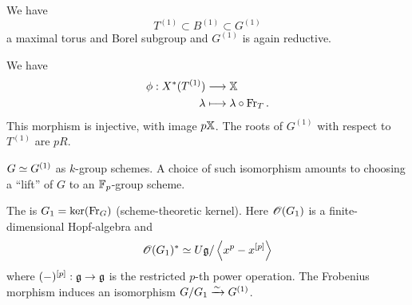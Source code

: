 We have
\[
T^{(1)} \subset B^{(1)}\subset G^{(1)}
\] 
a maximal torus and Borel subgroup and $G^{(1)}$ is again reductive. 

We have
\begin{align*}
	\phi: X^{*}(T^{(1)}) &\longrightarrow \mathbb{X} \\
	\lambda &\longmapsto \lambda\circ\operatorname{Fr}_T.
\end{align*}
This morphism is injective, with image $p\mathbb{X}$. The roots of $G^{(1)}$ with respect to $T^{(1)}$ are $pR$.
\begin{remark}
	$G\simeq G^{(1)}$ as $k$-group schemes. A choice of such isomorphism amounts to choosing a ``lift'' of $G$ to an $\mathbb{F}_p$-group scheme.
\end{remark}
The  is $G_1=\operatorname{ker}(\operatorname{Fr}_G)$ (scheme-theoretic kernel). Here $\mathscr{O}(G_1)$ is a finite-dimensional Hopf-algebra and
\[
	\mathscr{O}(G_1)^{*} \simeq U\mathfrak g / \left<x^{p} - x^{[p]} \right>
\] 
where $(-)^{[p]}:\kg\to \kg$ is the restricted $p$-th power operation. The Frobenius morphism induces an isomorphism $G /G_1\xrightarrow{\sim} G^{(1)}$.


